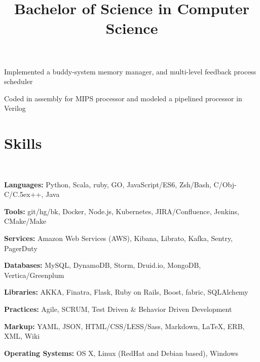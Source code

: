 \documentclass[12pt, tweaklist, line]{res}
\let\tempone\itemize
\let\temptwo\enditemize
\renewenvironment{itemize}{\tempone\vspace{-.15in}\setlength{\topsep}{0pt}\setlength{\itemsep}{3pt}\vspace{-.15in}}{\temptwo}
\def\Cplusplus{{\rm C\raise.5ex\hbox{\small ++}}}
\begin{document}
\begin{resume}
\title{Bachelor of Science in Computer Science}
\begin{position}
\begin{itemize}
\item Implemented a buddy-system memory manager, and multi-level feedback process scheduler
\item Coded in assembly for MIPS processor and modeled a pipelined processor in Verilog
\end{itemize}
\end{position}

\section{Skills}

~\\ %

\begin{itemize}
\item \textbf{Languages:} Python, Scala, ruby, GO, JavaScript/ES6, Zsh/Bash, C/Obj-C/\Cplusplus, Java
\item \textbf{Tools:} git/hg/bk, Docker, Node.js, Kubernetes, JIRA/Confluence, Jenkins, CMake/Make
\item \textbf{Services:} Amazon Web Services (AWS), Kibana, Librato, Kafka, Sentry, PagerDuty
\item \textbf{Databases:} MySQL, DynamoDB, Storm, Druid.io, MongoDB, Vertica/Greenplum
\item \textbf{Libraries:} AKKA, Finatra, Flask, Ruby on Rails, Boost, fabric, SQLAlchemy
\item \textbf{Practices:} Agile, SCRUM, Test Driven \& Behavior Driven Development
\item \textbf{Markup:} YAML, JSON, HTML/CSS/LESS/Sass, Markdown, \LaTeX, ERB, XML, Wiki
\item \textbf{Operating Systems:} OS X, Linux (RedHat and Debian based), Windows
\end{itemize}

\end{resume}
\end{document}
